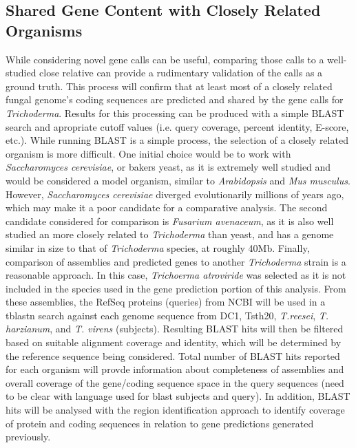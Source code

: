 \subsection{Shared Gene Content with Closely Related Organisms}

While considering novel gene calls can be useful, comparing those
calls to a well-studied close relative can provide a rudimentary
validation of the calls as a ground truth. This process will confirm
that at least most of a closely related fungal genome's coding
sequences are predicted and shared by the gene calls for
\textit{Trichoderma}. Results for this processing can be produced with
a simple BLAST search and apropriate cutoff values (i.e. query
coverage, percent identity, E-score, etc.). While running BLAST is a
simple process, the selection of a closely related organism is more
difficult. One initial choice would be to work with
\textit{Saccharomyces cerevisiae}, or bakers yeast, as it is extremely
well studied and would be considered a model organism, similar to
\textit{Arabidopsis} and \textit{Mus musculus}. However,
\textit{Saccharomyces cerevisiae} diverged evolutionarily millions of
years ago, which may make it a poor candidate for a comparative
analysis. The second candidate considered for comparison is
\textit{Fusarium avenaceum}, as it is also well studied an more
closely related to \textit{Trichoderma} than yeast, and has a genome
similar in size to that of \textit{Trichoderma} species, at roughly
40Mb. Finally, comparison of assemblies and predicted genes to another
\textit{Trichoderma} strain is a reasonable approach. In this case,
\textit{Trichoerma atroviride} was selected as it is not included in
the species used in the gene prediction portion of this analysis. From
these assemblies, the RefSeq proteins (queries) from NCBI will be used
in a tblastn search against each genome sequence from DC1, Tsth20,
\textit{T.reesei}, \textit{T. harzianum}, and \textit{T. virens}
(subjects). Resulting BLAST hits will then be filtered based on
suitable alignment coverage and identity, which will be determined by
the reference sequence being considered. Total number of BLAST hits
reported for each organism will provde information about completeness
of assemblies and overall coverage of the gene/coding sequence space
in the query sequences (need to be clear with language used for blast
subjects and query). In addition, BLAST hits will be analysed with the
region identification approach to identify coverage of protein and coding
sequences in relation to gene predictions generated previously.

